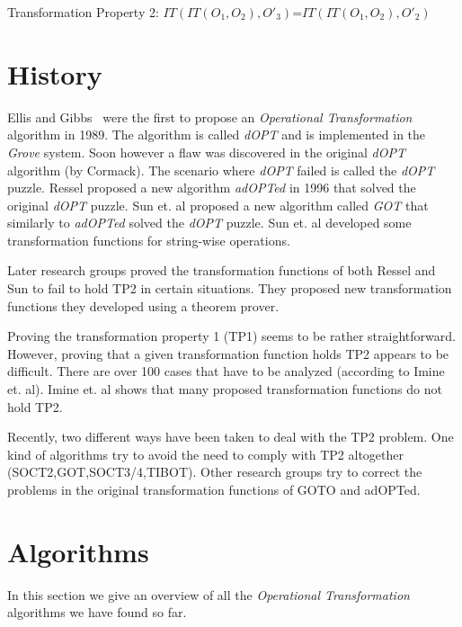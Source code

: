 \documentclass[11pt,a4paper]{article}
\begin{document}
\begin{defn}
Transformation Property 2: 
$IT(IT(O_{1},O_{2}),O'_{3})$=$IT(IT(O_{1},O_{2}),O'_{2})$
\end{defn}


\section{History}
{Ellis and Gibbs}~\cite{ellis} were the first to propose an \emph{Operational Transformation} algorithm in 1989. The algorithm is called \emph{dOPT} and is implemented in the \emph{Grove} system. Soon however a flaw was discovered in the original \emph{dOPT} algorithm (by Cormack\cite{cormack95a}). The scenario where \emph{dOPT} failed is called the \emph{dOPT} puzzle. Ressel\cite{ressel:adopted} proposed a new algorithm \emph{adOPTed} in 1996 that solved the original \emph{dOPT} puzzle. {Sun et. al}\cite{sun:achieving} proposed a new algorithm called \emph{GOT} that similarly to \emph{adOPTed} solved the \emph{dOPT} puzzle. {Sun et. al}\cite{sun:reversible} developed some transformation functions for string-wise operations.

Later research groups\cite{imine:development}\cite{imine:achieving} proved the transformation functions of both Ressel\cite{ressel:adopted} and Sun\cite{sun:achieving} to fail to hold TP2 in certain situations. They proposed new transformation functions they developed using a theorem prover. 

Proving the transformation property 1 (TP1) seems to be rather straightforward. However, proving that a given transformation function holds TP2 appears to be difficult. There are over 100 cases that have to be analyzed (according to {Imine et. al}\cite{imine:achieving}). Imine et. al shows that many proposed transformation functions do not hold TP2. 

Recently, two different ways have been taken to deal with the TP2 problem. One kind of algorithms try to avoid the need to comply with TP2 altogether (SOCT2\cite{},GOT\cite{},SOCT3/4\cite{suleiman00},TIBOT\cite{tibot}). Other research groups try to correct the problems in the original transformation functions of GOTO\cite{} and adOPTed\cite{ressel:adopted}. 


\section{Algorithms}
In this section we give an overview of all the \emph{Operational Transformation} algorithms we have found so far.
















\newpage

\end{document}
